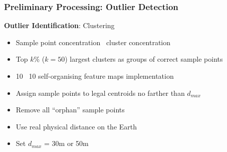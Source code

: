 \documentclass{beamer}
\theoremstyle{definition}
\begin{document}
\begin{frame}
\frametitle{Preliminary Processing: Outlier Detection}
\textbf{Outlier Identification}: Clustering
\begin{itemize}
	\item <2-> Sample point concentration \textrightarrow~cluster concentration
	\item <3-> Top $k\%$ ($k = 50$) largest clusters as groups of correct sample points
	\item <4-> 10 \texttimes~10 self-organising feature maps implementation
\end{itemize}

\begin{itemize}
	\item <6-> Assign sample points to legal centroids no farther than $d_{max}$
	\item <7-> Remove all ``orphan'' sample points
	\item <8-> Use real physical distance on the Earth
	\item <9-> Set $d_{max}$ = 30m or 50m
\end{itemize}

\end{frame}
%
%
%
\end{document}
